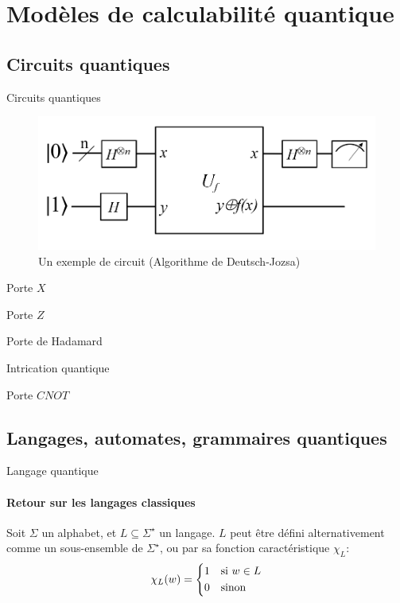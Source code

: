 \documentclass[aspectratio=169]{beamer}
\theoremstyle{plain}
\theoremstyle{definition}
\begin{document}
\section{Modèles de calculabilité quantique}
\subsection{Circuits quantiques}
\begin{frame}{Circuits quantiques}
    \begin{figure}[!ht]
        \centering
        \includegraphics[scale=0.5]{deutsch-circuit-n.png}
        \caption{Un exemple de circuit (Algorithme de Deutsch-Jozsa)}
    \end{figure}
\end{frame}

\begin{frame}{Porte $X$}
\end{frame}

\begin{frame}{Porte $Z$}
\end{frame}

\begin{frame}{Porte de Hadamard}
\end{frame}

\begin{frame}{Intrication quantique}
\end{frame}

\begin{frame}{Porte $CNOT$}
\end{frame}

\subsection{Langages, automates, grammaires quantiques}
\begin{frame}{Langage quantique}
    \framesubtitle{Retour sur les langages classiques}
    Soit $\Sigma$ un alphabet, et $L\subseteq \Sigma^\star$ un langage. $L$ peut être défini alternativement comme un sous-ensemble de $\Sigma^\star$, ou par sa fonction caractéristique $\chi_L$:
    \begin{equation*}
        \chi_L(w) = \begin{cases*}
            1 & si $w\in L$\\
            0 & sinon
        \end{cases*}
    \end{equation*}
\end{frame}
\end{document}
